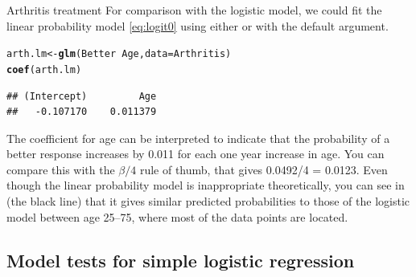 \documentclass[11pt]{book}\usepackage[]{graphicx}\usepackage[]{color}
\makeatletter
\newcommand{\hlopt}[1]{\textcolor[rgb]{0,0,0}{#1}}%
\newcommand{\hlstd}[1]{\textcolor[rgb]{0.345,0.345,0.345}{#1}}%
\newcommand{\hlkwb}[1]{\textcolor[rgb]{0.69,0.353,0.396}{#1}}%
\newcommand{\hlkwc}[1]{\textcolor[rgb]{0.333,0.667,0.333}{#1}}%
\newcommand{\hlkwd}[1]{\textcolor[rgb]{0.737,0.353,0.396}{\textbf{#1}}}%
\newenvironment{kframe}{%
 \def\at@end@of@kframe{}%
 \ifinner\ifhmode%
  \def\at@end@of@kframe{\end{minipage}}%
  \begin{minipage}{\columnwidth}%
 \fi\fi%
 \def\FrameCommand##1{\hskip\@totalleftmargin \hskip-\fboxsep
 \colorbox{shadecolor}{##1}\hskip-\fboxsep
     \hskip-\linewidth \hskip-\@totalleftmargin \hskip\columnwidth}%
 \MakeFramed {\advance\hsize-\width
   \@totalleftmargin\z@ \linewidth\hsize
   \@setminipage}}%
 {\par\unskip\endMakeFramed%
 \at@end@of@kframe}
\newenvironment{knitrout}{}{} %
\renewenvironment{knitrout}{\small\renewcommand{\baselinestretch}{.85}}{} %
\makeatother
\begin{document}
\begin{Example}[arthrit6]{Arthritis treatment}
For comparison with the logistic model, we could fit the linear probability model
\eqref{eq:logit0} using either  or  with the default
 argument.
\begin{knitrout}
\color{fgcolor}\begin{kframe}
\begin{alltt}
\hlstd{arth.lm} \hlkwb{<-} \hlkwd{glm}\hlstd{(Better} \hlopt{~} \hlstd{Age,} \hlkwc{data}\hlstd{=Arthritis)}
\hlkwd{coef}\hlstd{(arth.lm)}
\end{alltt}
\begin{verbatim}
## (Intercept)         Age 
##   -0.107170    0.011379
\end{verbatim}
\end{kframe}
\end{knitrout}
The coefficient for age can be interpreted to indicate that the probability of a better
response increases by 0.011 for each one year increase in age.  You can compare this
with the $\beta / 4$ rule of thumb, that gives 0.0492/4 = 0.0123.
Even though the linear probability model is inappropriate theoretically, you can
see in  (the black line)
that it gives similar predicted probabilities to those of the logistic
model between age 25--75, where most of the data points are located.


\end{Example}

\subsection{Model tests for simple logistic regression}\label{sec:logist-tests}
\end{document}
